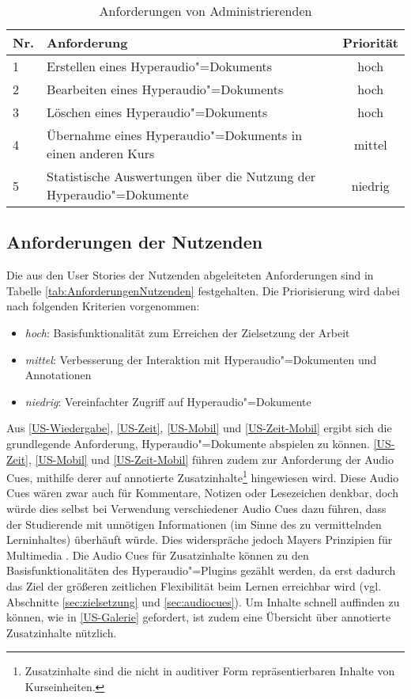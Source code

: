 \begin{table}[!ht]
\def\arraystretch{1.4}

 \begin{tabularx}{\textwidth}{lXc}      
    \hline
    Nr. & Anforderung & Priorität
    \\\hline
    1 & Erstellen eines Hyperaudio"=Dokuments & hoch\\
    2 & Bearbeiten eines Hyperaudio"=Dokuments & hoch\\
    3 & Löschen eines Hyperaudio"=Dokuments & hoch\\
    4 & Übernahme eines Hyperaudio"=Dokuments in einen anderen Kurs & mittel\\
    5 & Statistische Auswertungen über die Nutzung der Hyperaudio"=Dokumente & niedrig\\
    \hline
    \end{tabularx}
    \caption{Anforderungen von Administrierenden}
\label{tab:AnforderungenAdministrierenden}
\end{table}

\subsection{Anforderungen der Nutzenden}
\label{sub:AnforderungenDerNutzenden}
Die aus den User Stories der Nutzenden abgeleiteten Anforderungen sind in Tabelle \ref{tab:AnforderungenNutzenden} festgehalten. Die Priorisierung wird dabei nach folgenden Kriterien vorgenommen:

\begin{itemize}
\item \textit{hoch}: Basisfunktionalität zum Erreichen der Zielsetzung der Arbeit
\item \textit{mittel}: Verbesserung der Interaktion mit Hyperaudio"=Dokumenten und Annotationen
\item \textit{niedrig}: Vereinfachter Zugriff auf Hyperaudio"=Dokumente
\end{itemize}


Aus \ref{US-Wiedergabe}, \ref{US-Zeit}, \ref{US-Mobil} und \ref{US-Zeit-Mobil} ergibt sich die grundlegende Anforderung, Hyperaudio"=Dokumente abspielen zu können. \ref{US-Zeit}, \ref{US-Mobil} und \ref{US-Zeit-Mobil} führen zudem zur Anforderung der Audio Cues, mithilfe derer auf annotierte Zusatzinhalte\footnote{Zusatzinhalte sind die nicht in auditiver Form repräsentierbaren Inhalte von Kurseinheiten.} hingewiesen wird. Diese Audio Cues wären zwar auch für Kommentare, Notizen oder Lesezeichen denkbar, doch würde dies selbst bei Verwendung verschiedener Audio Cues dazu führen, dass der Studierende mit unnötigen Informationen (im Sinne des zu vermittelnden Lerninhaltes) überhäuft würde. Dies widerspräche jedoch Mayers Prinzipien für Multimedia \citep{mayer2009multimedia}. Die Audio Cues für Zusatzinhalte können zu den Basisfunktionalitäten des Hyperaudio"=Plugins gezählt werden, da erst dadurch das Ziel der größeren zeitlichen Flexibilität beim Lernen erreichbar wird (vgl. Abschnitte \ref{sec:zielsetzung} und \ref{sec:audiocues}). Um Inhalte schnell auffinden zu können, wie in \ref{US-Galerie} gefordert, ist zudem eine Übersicht über annotierte Zusatzinhalte nützlich.


